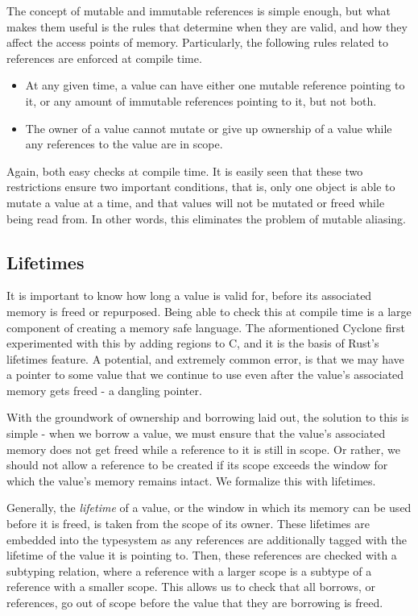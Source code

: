 \documentclass[letterpaper,11pt]{article}
\begin{document}
The concept of mutable and immutable references is simple enough, but what makes them
useful is the rules that determine when they are valid, and how they affect the
access points of memory. Particularly, the following rules related to references
are enforced at compile time.
\begin{itemize}
    \item At any given time, a value can have either one mutable reference pointing to it, or any amount of immutable references pointing to it, but not both.
    \item The owner of a value cannot mutate or give up ownership of a value while any references to the value are in scope.
\end{itemize}
Again, both easy checks at compile time. It is easily seen that these two restrictions
ensure two important conditions, that is, only one object is able to mutate a value
at a time, and that values will not be mutated or freed while being read from. In
other words, this eliminates the problem of mutable aliasing.

\subsection{Lifetimes}
It is important to know how long a value is valid for, before its associated memory
is freed or repurposed. Being able to check this at compile time is a large component
of creating a memory safe language. The aformentioned Cyclone first experimented
with this by adding regions to C, and it is the basis of Rust's lifetimes feature.
A potential, and extremely common error, is that we may have a pointer to some value
that we continue to use even after the value's associated memory gets freed - a dangling pointer.

With the groundwork of ownership and borrowing laid out, the solution to this is
simple - when we borrow a value, we must ensure that the value's associated memory
does not get freed while a reference to it is still in scope. Or rather, we should
not allow a reference to be created if its scope exceeds the window for which
the value's memory remains intact. We formalize this with lifetimes.

Generally, the \textit{lifetime} of a value, or the window in which its memory
can be used before it is freed, is taken from the scope of its owner. These
lifetimes are embedded into the typesystem as any references are additionally
tagged with the lifetime of the value it is pointing to. Then, these references
are checked with a subtyping relation, where a reference with a larger scope
is a subtype of a reference with a smaller scope. This allows us to check that
all borrows, or references, go out of scope before the value that they are borrowing
is freed.
\end{document}
